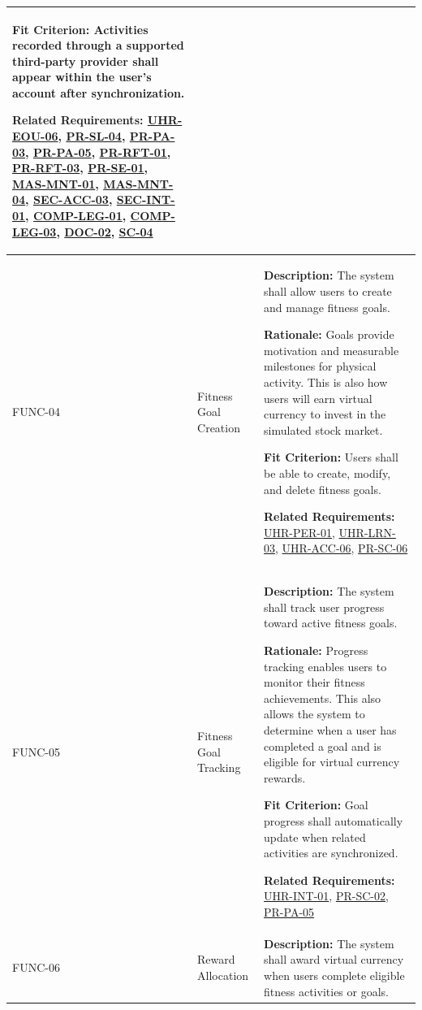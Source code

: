\documentclass[12pt]{article}
\begin{document}
\begin{xltabular}{\textwidth}{|p{2.6cm}|p{3.4cm}|X|}
\textbf{Fit Criterion:} Activities recorded through a supported third-party provider shall appear within the user's account after synchronization.

\textbf{Related Requirements:} \hyperlink{req:UHR-EOU-06}{UHR-EOU-06}, \hyperlink{req:PR-SL-04}{PR-SL-04}, \hyperlink{req:PR-PA-03}{PR-PA-03}, \hyperlink{req:PR-PA-05}{PR-PA-05}, \hyperlink{req:PR-RFT-01}{PR-RFT-01}, \hyperlink{req:PR-RFT-03}{PR-RFT-03}, \hyperlink{req:PR-SE-01}{PR-SE-01}, \hyperlink{req:MAS-MNT-01}{MAS-MNT-01}, \hyperlink{req:MAS-MNT-04}{MAS-MNT-04}, \hyperlink{req:SEC-ACC-03}{SEC-ACC-03}, \hyperlink{req:SEC-INT-01}{SEC-INT-01}, \hyperlink{req:COMP-LEG-01}{COMP-LEG-01}, \hyperlink{req:COMP-LEG-03}{COMP-LEG-03}, \hyperlink{req:DOC-02}{DOC-02}, \hyperlink{req:SC-04}{SC-04}\\
\hline

FUNC-04\hypertarget{req:FUNC-04}{} & 
Fitness Goal Creation & 
\textbf{Description:} The system shall allow users to create and manage fitness goals.

\textbf{Rationale:} Goals provide motivation and measurable milestones for physical activity. This is also how users will earn virtual currency to invest in the simulated stock market.

\textbf{Fit Criterion:} Users shall be able to create, modify, and delete fitness goals.

\textbf{Related Requirements:} \hyperlink{req:UHR-PER-01}{UHR-PER-01}, \hyperlink{req:UHR-LRN-03}{UHR-LRN-03}, \hyperlink{req:UHR-ACC-06}{UHR-ACC-06}, \hyperlink{req:PR-SC-06}{PR-SC-06}\\
\hline

FUNC-05\hypertarget{req:FUNC-05}{} & 
Fitness Goal Tracking & 
\textbf{Description:} The system shall track user progress toward active fitness goals.

\textbf{Rationale:} Progress tracking enables users to monitor their fitness achievements. This also allows the system to determine when a user has completed a goal and is eligible for virtual currency rewards.

\textbf{Fit Criterion:} Goal progress shall automatically update when related activities are synchronized.

\textbf{Related Requirements:} \hyperlink{req:UHR-INT-01}{UHR-INT-01}, \hyperlink{req:PR-SC-02}{PR-SC-02}, \hyperlink{req:PR-PA-05}{PR-PA-05}\\
\hline

FUNC-06\hypertarget{req:FUNC-06}{} & 
Reward Allocation & 
\textbf{Description:} The system shall award virtual currency when users complete eligible fitness activities or goals.


\end{xltabular}
\end{document}
